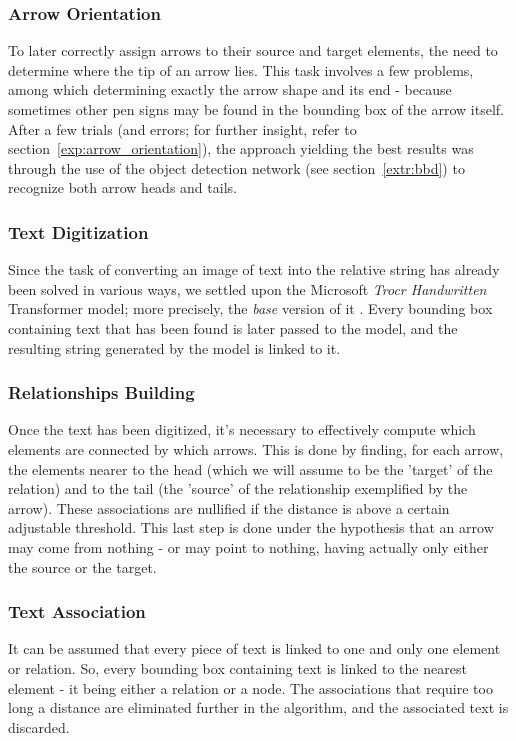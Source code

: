 \documentclass[conference]{IEEEtran}
\begin{document}
\subsubsection{Arrow Orientation}
To later correctly assign arrows to their source and target elements, the need to determine where the tip of an arrow lies. This task involves a few problems, among which determining exactly the arrow shape and its end - because sometimes other pen signs may be found in the bounding box of the arrow itself. After a few trials (and errors; for further insight, refer to section~\ref{exp:arrow_orientation}), the approach yielding the best results was through the use of the object detection network (see section~\ref{extr:bbd}) to recognize both arrow heads and tails. \\

\subsubsection{Text Digitization}
Since the task of converting an image of text into the relative string has already been solved in various ways, we settled upon the Microsoft \textit{Trocr Handwritten} Transformer model; more precisely, the \textit{base} version of it \cite{microsofttrocr}. Every bounding box containing text that has been found is later passed to the model, and the resulting string generated by the model is linked to it.\\

\subsubsection{Relationships Building}
Once the text has been digitized, it's necessary to effectively compute which elements are connected by which arrows. This is done by finding, for each arrow, the elements nearer to the head (which we will assume to be the 'target' of the relation) and to the tail (the 'source' of the relationship exemplified by the arrow). These associations are nullified if the distance is above a certain adjustable threshold. This last step is done under the hypothesis that an arrow may come from nothing - or may point to nothing, having actually only either the source or the target. \\

\subsubsection{Text Association}
It can be assumed that every piece of text is linked to one and only one element or relation. So, every bounding box containing text is linked to the nearest element - it being either a relation or a node. The associations that require too long a distance are eliminated further in the algorithm, and the associated text is discarded.\\
\end{document}
